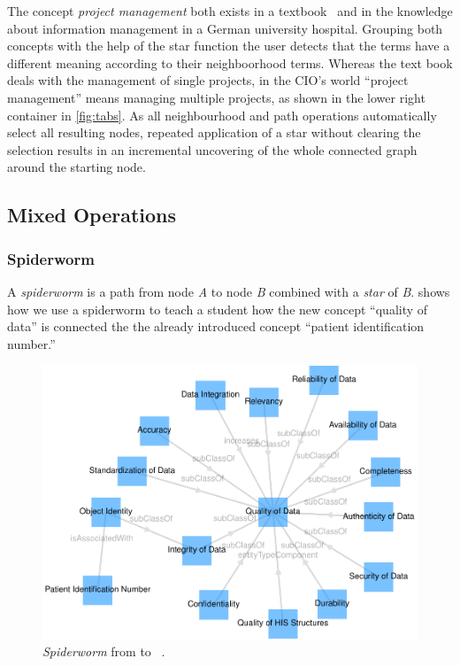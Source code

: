 \documentclass[conference]{IEEEtran}
\begin{document}
The concept \emph{project management} both exists in a textbook~\cite{ob} and in the knowledge about information management in a German university hospital.
Grouping both concepts with the help of the star function the user detects that the terms have a different meaning according to their neighboorhood terms.
Whereas the text book deals with the management of single projects, in the CIO's world \enquote{project management} means managing multiple projects, as shown in the lower right container in \cref{fig:tabs}.
As all neighbourhood and path operations automatically select all resulting nodes, repeated application of a star without clearing the selection results in an incremental uncovering of the whole connected graph around the starting node.

\subsection{Mixed Operations}
\subsubsection{Spiderworm}
A \emph{spiderworm} is a path from node \emph{A} to node \emph{B} combined with a \emph{star} of \emph{B}.
 shows how we use a spiderworm to teach a student how the new concept \enquote{quality of data} is connected the the already introduced concept \enquote{patient identification number.}

\begin{figure}[h!]
    \centering
    \includegraphics[width=0.5\linewidth]{spiderworm.pdf}
    \caption{\emph{Spiderworm} from  to ~\cite{snikgraphposter}.}
	\label{fig:spiderworm}
\end{figure}
\vspace{-3pt}
\end{document}
